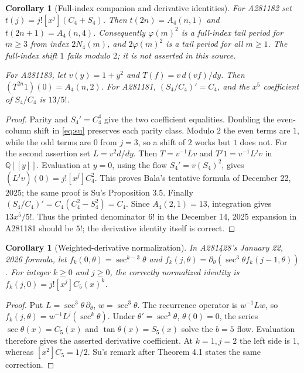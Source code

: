 \documentclass[11pt]{article}
\newtheorem{corollary}[theorem]{Corollary}
\newcommand{\Q}{\mathbb Q}
\begin{document}
\begin{corollary}[Full-index companion and derivative identities]\label{cor:identities}
For A281182 set $t(j)=j![x^j](C_4+S_4)$. Then
$t(2n)=A_4(n,1)$ and $t(2n+1)=A_4(n,4)$.
Consequently $\varphi(m)^2$ is a full-index tail period for $m\geq3$
from index $2N_4(m)$, and $2\varphi(m)^2$ is a tail period for all $m\geq1$.
The full-index shift $1$ fails modulo $2$; it is not asserted in this source.

For A281183, let $v(y)=1+y^2$ and
$T(f)=v\,d(vf)/dy$. Then $(T^{2n}1)(0)=A_4(n,2)$.
For A281181, $(S_4/C_4)'=C_4$, and the $x^5$ coefficient of $S_4/C_4$
is $13/5!$.
\end{corollary}
\begin{proof}
Parity and $S_4'=C_4^4$ give the two coefficient equalities. Doubling
the even-column shift in \eqref{eq:su} preserves each parity class.
Modulo $2$ the even terms are $1$, while the odd terms are $0$ from
$j=3$, so a shift of $2$ works but $1$ does not.
For the second assertion set $L=v^2d/dy$. Then $T=v^{-1}Lv$ and
$T^j1=v^{-1}L^jv$ in $\Q[[y]]$. Evaluation at $y=0$, using the flow
$S_4'=v(S_4)^2$, gives $(L^jv)(0)=j![x^j]C_4^2$.
This proves Bala's tentative formula of December 22, 2025;
the same proof is Su's Proposition 3.5.
Finally $(S_4/C_4)'=C_4(C_4^2-S_4^2)=C_4$.
Since $A_4(2,1)=13$, integration gives $13x^5/5!$.
Thus the printed denominator $6!$ in the December 14, 2025 expansion
in A281181 should be $5!$; the derivative identity itself is correct.
\end{proof}

\begin{corollary}[Weighted-derivative normalization]\label{cor:factorial}
In A281428's January 22, 2026 formula, let
$f_k(0,\theta)=\sec^{k-3}\theta$ and
$f_k(j,\theta)=\partial_\theta(\sec^3\theta f_k(j-1,\theta))$.
For integer $k\geq0$ and $j\geq0$, the correctly normalized identity is
$f_k(j,0)=j![x^j]C_5(x)^k$.
\end{corollary}
\begin{proof}
Put $L=\sec^3\theta\,\partial_\theta$, $w=\sec^3\theta$.
The recurrence operator is $w^{-1}Lw$, so
$f_k(j,\theta)=w^{-1}L^j(\sec^k\theta)$.
Under $\theta'=\sec^3\theta$, $\theta(0)=0$, the series
$\sec\theta(x)=C_5(x)$ and $\tan\theta(x)=S_5(x)$ solve the $b=5$ flow.
Evaluation therefore gives the asserted derivative coefficient.
At $k=1,j=2$ the left side is $1$, whereas $[x^2]C_5=1/2$.
Su's remark after Theorem 4.1 states the same correction.
\end{proof}
\end{document}
